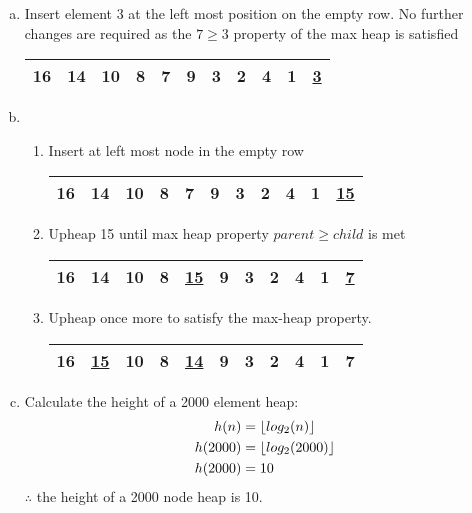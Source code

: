 \documentclass[fleqn, 12pt]{article}
\DeclarePairedDelimiter\floor{\lfloor}{\rfloor}
\begin{document}
\begin{enumerate}[a)]
\item Insert element 3 at the left most position on the empty row. No further changes are required as the $7\ge3$ property of the max heap is satisfied
        \begin{center}
            \begin{tabular}{|*{11}{c|}}
                \hline
                16 & 14 & 10 & 8 & 7 & 9 & 3 & 2 & 4 & 1 & \underline{3}\\
                \hline
            \end{tabular}
        \end{center}
        
\item
    \begin{enumerate}[Step 1:]
    \item Insert at left most node in the empty row
        \begin{center}
            \begin{tabular}{|*{11}{c|}}
                \hline
                16 & 14 & 10 & 8 & 7 & 9 & 3 & 2 & 4 & 1 & \underline{15}\\
                \hline
            \end{tabular}
        \end{center}
        

    \item Upheap 15 until max heap property $parent \ge child$ is met
        \begin{center}
            \begin{tabular}{|*{11}{c|}}
                \hline
                16 & 14 & 10 & 8 & \underline{15} & 9 & 3 & 2 & 4 & 1 & \underline{7}\\
                \hline
            \end{tabular}
        \end{center}
        
    \item Upheap once more to satisfy the max-heap property.
        \begin{center}
            \begin{tabular}{|*{11}{c|}}
                \hline
                16 & \underline{15} & 10 & 8 & \underline{14} & 9 & 3 & 2 & 4 & 1 & 7\\
                \hline
            \end{tabular}
        \end{center}
    \end{enumerate}

\item Calculate the height of a 2000 element heap:
    \begin{align*}
      h(n) &= \floor{log_2 (n)} \\
      h(2000) &= \floor{log_2 (2000)}\\
      h(2000) &= 10
    \end{align*}
    $\therefore$ the height of a 2000 node heap is 10.

\end{enumerate}
\end{document}
